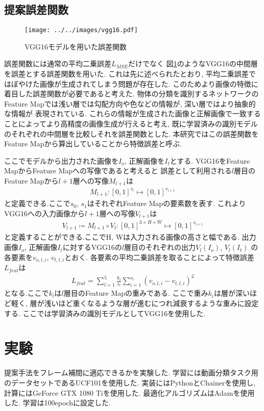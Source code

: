 \documentclass[twocolumn, a4j, uplatex]{jsarticle}
\begin{document}
\subsection{提案誤差関数}
\begin{figure}[htbp]
    \centering
    \texttt{[image: ../../images/vgg16.pdf]}
    \caption{VGG16モデルを用いた誤差関数}
    \label{fig:vgg16loss}
\end{figure}

誤差関数には通常の平均二乗誤差$L_{MSE}$だけでなく
図\ref{fig:vgg16loss}のようなVGG16\cite{VGG16}の中間層を誤差とする誤差関数を用いた.
これは先に述べられたとおり, 平均二乗誤差ではぼやけた画像が生成されてしまう問題が存在した.
このためより画像の特徴に着目した誤差関数が必要であると考えた.
物体の分類を識別するネットワークのFeature Mapでは浅い層では勾配方向や色などの情報が, 深い層ではより抽象的な情報が
表現されている. これらの情報が生成された画像と正解画像で一致することによってより高精度の画像生成が行えると考え,
既に学習済みの識別モデルのそれぞれの中間層を比較しそれを誤差関数とした.
本研究ではこの誤差関数をFeature Mapから算出していることから特徴誤差と呼ぶ.

ここでモデルから出力された画像を$I_o$, 正解画像を$I_t$とする.
VGG16をFeature MapからFeature Mapへの写像であると考えると
誤差として利用される$l$層目のFeature Mapから$l+1$層への写像$M_{l+1}$は
\begin{align}
    M_{l+1} : [0, 1]^{s_l} \mapsto [0, 1]^{s_{l+1}}
\end{align}
と定義できる.ここで$s_0$, $s_1$はそれぞれFeature Mapの要素数を表す.
これよりVGG16への入力画像から$l+1$層への写像$V_{l+1}$は
\begin{align}
    V_{l+1} \coloneqq M_{l+1} \circ V_l : [0, 1]^{3 \times H \times W} \mapsto [0, 1]^{s_{l+1}}
\end{align}
と定義することができる.ここでH, Wは入力される画像の高さと幅である.
出力画像$I_o$, 正解画像$I_t$に対するVGG16の$l$層目のそれぞれの出力$V_{l}(I_o)$, $V_{l}(I_t)$
の各要素を$v_{o,l,i}$, $v_{t,l,i}$とおく.
各要素の平均二乗誤差を取ることによって特徴誤差$L_{feat}$は
\begin{align}
    L_{feat} = \sum_{l=1}^5 \frac{k_l}{s_l} \sum_{i=1}^{s_l} (v_{o,l,i}-v_{t,l,i})^2
\end{align}
となる.ここで$k_l$は$l$層目のFeature Mapの重みである.
ここで重み$k_i$は層が深いほど軽く, 層が浅いほど重くなるような層が進むにつれ減衰するような重みに設定する.
ここでは学習済みの識別モデルとしてVGG16\cite{VGG16}を使用した.

\section{実験}
提案手法をフレーム補間に適応できるかを実験した.
学習には動画分類タスク用のデータセットであるUCF101\cite{UCF101}を使用した.
実装にはPythonとChainer\cite{chainer_learningsys2015}を使用し, 計算にはGeForce GTX 1080 Tiを使用した.
最適化アルゴリズムはAdam\cite{kingma2014adam}を使用した. 学習は100epochに設定した.
\end{document}
